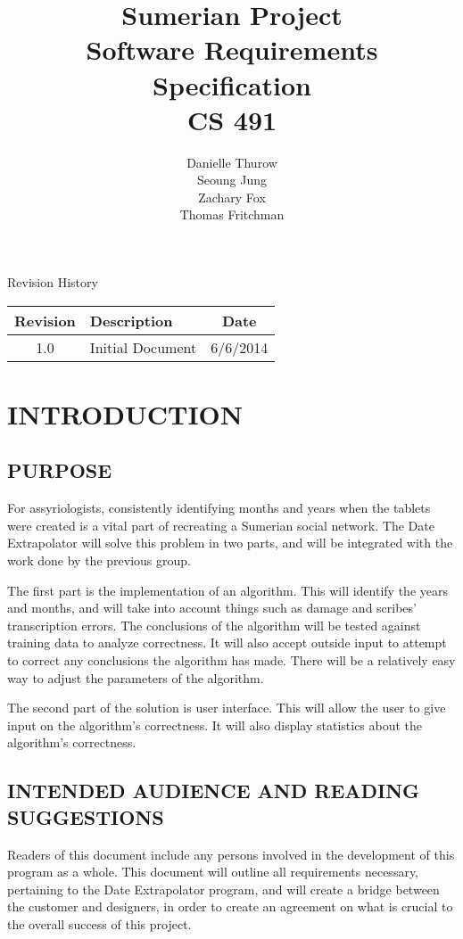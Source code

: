 \documentclass[11pt]{article}
\title{Sumerian Project\\
Software Requirements Specification\\
CS 491}
\author{Danielle Thurow \\
Seoung Jung\\
Zachary Fox\\
Thomas Fritchman}
\date{}
\begin{document}
\maketitle
\newpage

\tableofcontents
\newpage

\begin{center}
\Large Revision History\\
\begin{tabularx}{\textwidth}{|c|X|c|}
    \hline
    \textbf{Revision} & \textbf{Description} & \textbf{Date}\\ \hline
    1.0 & Initial Document & 6/6/2014\\ \hline
\end{tabularx}
\end{center}
\newpage

\section{INTRODUCTION}
\subsection{PURPOSE}
For assyriologists, consistently identifying months and years when the tablets were created is a vital part of recreating a Sumerian social network. The Date Extrapolator will solve this problem in two parts, and will be integrated with the work done by the previous group. 

The first part is the implementation of an algorithm. This will identify the years and months, and will take into account things such as damage and scribes’ transcription errors. The conclusions of the algorithm will be tested against training data to analyze correctness. It will also accept outside input to attempt to correct any conclusions the algorithm has made. There will be a relatively easy way to adjust the parameters of the algorithm.

The second part of the solution is user interface. This will allow the user to give input on the algorithm’s correctness. It will also display statistics about the algorithm’s correctness.

\subsection{INTENDED AUDIENCE AND READING SUGGESTIONS}
Readers of this document include any persons involved in the development of this program as a whole. This document will outline all requirements necessary, pertaining to the Date Extrapolator program, and will create a bridge between the customer and designers, in order to create an agreement on what is crucial to the overall success of this project. 
\end{document}
